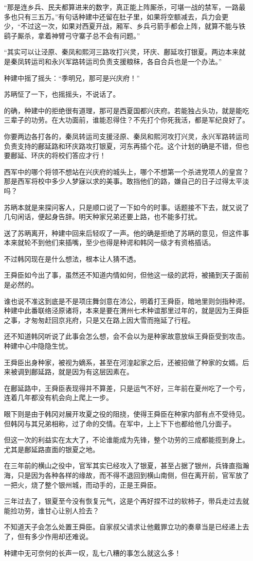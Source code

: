 “那是连乡兵、民夫都算进来的数字，真正能上阵厮杀，可堪一战的禁军，一路最多也只有三五万。”有句话种建中还留在肚子里，如果将空额减去，兵力会更少，“不过这一次，如果对西夏开战，厢军、乡兵弓箭手都会上阵，就算不能与铁鹞子厮杀，拿着神臂弓守寨子总不会有问题。”

“其实可以让泾原、秦凤和熙河三路攻打兴灵，环庆、鄜延攻打银夏。两边本来就是秦凤转运司和永兴军路转运司负责支援粮秣，各自合兵也是一个办法。”

种建中摇了摇头：“季明兄，那可是兴庆府！”

苏昞怔了一下，也摇摇头，不说话了。

的确，种建中的拒绝很有道理，那可是西夏国都兴庆府。若能独占头功，就是能吃三辈子的功劳。在大功面前，谁能忍得住？不先打个你死我活，都是军纪良好了。

你要两边各打各的，秦凤转运司支援泾原、秦凤和熙河攻打兴灵，永兴军路转运司负责支持的鄜延路和环庆路攻打银夏，河东再插个花。这个计划的确是不错，但也要鄜延、环庆的将校们答应才行！

西军中的哪个将领不想站在兴庆府的城头上，哪个不想第一个杀进党项人的皇宫？那是西军将校中多少人梦寐以求的美事。敢挡他们的路，嫌自己的日子过得太平淡吗？

苏昞本就是来探问客人，只是顺口说了一下如今的时事。话题接不下去，就又说了几句闲话，便起身告辞。明天种家兄弟还要上路，也不能多打扰。

送了苏昞离开，种建中回来后轻叹了一声。他的确是拒绝了苏昞的意见，但这件事本来就轮不到他们来插嘴，至少也得是种谔和韩冈一级才有资格插话。

不过韩冈现在是什么想法，根本让人猜不透。

王舜臣如今出了事，虽然还不知道内情如何，但他这一级的武将，被捅到天子面前是必然的。

谁也说不准这到底是不是项庄舞剑意在沛公，明着打王舜臣，暗地里则剑指种谔。种建中此番联络泾原诸将，本来是要在渭州七术种谊那里过年的，就是因为王舜臣之事，才匆匆赶回京兆府，只是又在路上因大雪而拖延了行程。

还不知道韩冈听说了此事会怎么想，会不会以为是种家故意放纵王舜臣受到攻击。种建中心中隐隐生忧。

王舜臣出身种家，被视为嫡系，甚至在河湟起家之后，还被招做了种家的女婿。后来被调到鄜延路，就是因为有这层因素在。

在鄜延路中，王舜臣表现得并不算差，只是运气不好，三年前在夏州吃了一个亏，连着几年都没有机会向上爬上一步。

眼下则是由于韩冈对展开攻夏之役的阻挠，使得王舜臣在种家内部有点不受待见。但韩冈与其兄弟相称，过了命的交情。在军中，上上下下也都给他几分面子。

但这一次的利益实在太大了，不论谁能成为先锋，整个功劳的三成都能揽到身上。尤其是鄜延路直面的银夏之地。

在三年前的横山之役中，官军其实已经攻入了银夏，甚至占据了银州，兵锋直指瀚海，只是因为各种各样的缘故，而不得不退回到横山南侧，但在离开前，官军放了一把火，烧了整个银州城，而动手的，正是王舜臣。

三年过去了，银夏至今没有恢复元气，这是个再好捏不过的软柿子，带兵走过去就能捡功劳，谁甘心让别人捡去？

不知道天子会怎么处置王舜臣。自家叔父请求让他戴罪立功的奏章当是已经递上去了，但有多少作用却还难说。

种建中无可奈何的长声一叹，乱七八糟的事怎么就这么多！

